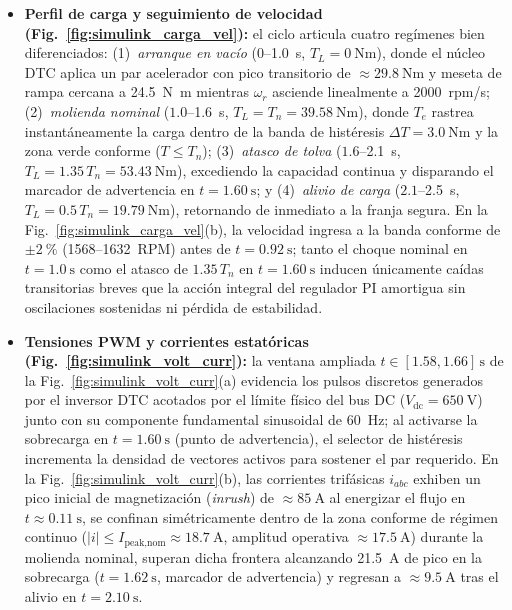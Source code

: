 \begin{itemize}\setlength{\itemsep}{2pt}\setlength{\topsep}{2pt}
    \item \textbf{Perfil de carga y seguimiento de velocidad (Fig.~\ref{fig:simulink_carga_vel}):} el ciclo articula cuatro regímenes bien diferenciados: (1)~\emph{arranque en vacío} ($0$--\qty{1.0}{\second}, $T_L=\qty{0}{\newton\meter}$), donde el núcleo DTC aplica un par acelerador con pico transitorio de $\approx\qty{29.8}{\newton\meter}$ y meseta de rampa cercana a \qty{24.5}{\newton\meter} mientras $\omega_r$ asciende linealmente a \qty{2000}{rpm/s}; (2)~\emph{molienda nominal} ($1.0$--\qty{1.6}{\second}, $T_L=T_n=\qty{39.58}{\newton\meter}$), donde $T_e$ rastrea instantáneamente la carga dentro de la banda de histéresis $\Delta T=\qty{3.0}{\newton\meter}$ y la zona verde conforme ($T\le T_n$); (3)~\emph{atasco de tolva} ($1.6$--\qty{2.1}{\second}, $T_L=1.35\,T_n=\qty{53.43}{\newton\meter}$), excediendo la capacidad continua y disparando el marcador de advertencia en $t=\qty{1.60}{\second}$; y (4)~\emph{alivio de carga} ($2.1$--\qty{2.5}{\second}, $T_L=0.5\,T_n=\qty{19.79}{\newton\meter}$), retornando de inmediato a la franja segura. En la Fig.~\ref{fig:simulink_carga_vel}(b), la velocidad ingresa a la banda conforme de $\pm\qty{2}{\percent}$ (\num{1568}--\qty{1632}{RPM}) antes de $t=\qty{0.92}{\second}$; tanto el choque nominal en $t=\qty{1.0}{\second}$ como el atasco de $1.35\,T_n$ en $t=\qty{1.60}{\second}$ inducen únicamente caídas transitorias breves que la acción integral del regulador PI amortigua sin oscilaciones sostenidas ni pérdida de estabilidad.
    \item \textbf{Tensiones PWM y corrientes estatóricas (Fig.~\ref{fig:simulink_volt_curr}):} la ventana ampliada $t\in[\num{1.58}, \num{1.66}]\,\unit{\second}$ de la Fig.~\ref{fig:simulink_volt_curr}(a) evidencia los pulsos discretos generados por el inversor DTC acotados por el límite físico del bus DC ($V_{\text{dc}}=\qty{650}{\volt}$) junto con su componente fundamental sinusoidal de \qty{60}{\hertz}; al activarse la sobrecarga en $t=\qty{1.60}{\second}$ (punto de advertencia), el selector de histéresis incrementa la densidad de vectores activos para sostener el par requerido. En la Fig.~\ref{fig:simulink_volt_curr}(b), las corrientes trifásicas $i_{abc}$ exhiben un pico inicial de magnetización (\emph{inrush}) de $\approx\qty{85}{\ampere}$ al energizar el flujo en $t\approx\qty{0.11}{\second}$, se confinan simétricamente dentro de la zona conforme de régimen continuo ($|i|\le I_{\text{peak,nom}}\approx\qty{18.7}{\ampere}$, amplitud operativa $\approx\qty{17.5}{\ampere}$) durante la molienda nominal, superan dicha frontera alcanzando \qty{21.5}{\ampere} de pico en la sobrecarga ($t=\qty{1.62}{\second}$, marcador de advertencia) y regresan a $\approx\qty{9.5}{\ampere}$ tras el alivio en $t=\qty{2.10}{\second}$.

\end{itemize}
